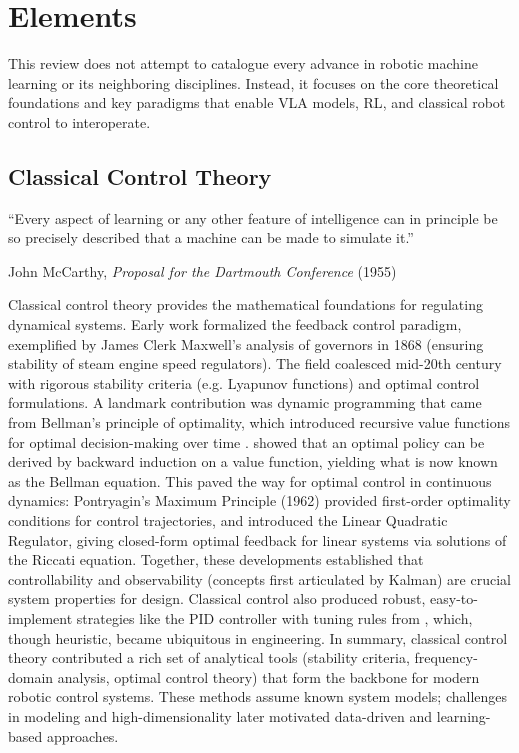 \chapter{Elements}
\label{sec:elements}


This review does not attempt to catalogue every advance in robotic machine learning or its neighboring disciplines.  Instead, it focuses on the core theoretical foundations and key paradigms that enable \ac{VLA} models, \ac{RL}, and classical robot control to interoperate.

\section{Classical Control Theory}
\epigraph{``Every aspect of learning or any other feature of intelligence can in principle be so precisely described that a machine can be made to simulate it.''}{John McCarthy, \textit{Proposal for the Dartmouth Conference} (1955)}

Classical control theory provides the mathematical foundations for regulating dynamical systems. Early work formalized the feedback control paradigm, exemplified by James Clerk Maxwell’s analysis of governors in 1868 (ensuring stability of steam engine speed regulators). The field coalesced mid-20th century with rigorous stability criteria (e.g. Lyapunov functions) and optimal control formulations. A landmark contribution was dynamic programming that came from Bellman’s principle of optimality, which introduced recursive value functions for optimal decision-making over time \cite{BELLMAN1952}. \textcite{BELLMAN1952} showed that an optimal policy can be derived by backward induction on a value function, yielding what is now known as the Bellman equation. This paved the way for optimal control in continuous dynamics: Pontryagin’s Maximum Principle (1962) provided first-order optimality conditions for control trajectories, and \textcite{KALMAN1960} introduced the Linear Quadratic Regulator, giving closed-form optimal feedback for linear systems via solutions of the Riccati equation. Together, these developments established that controllability and observability (concepts first articulated by Kalman) are crucial system properties for design. Classical control also produced robust, easy-to-implement strategies like the PID controller with tuning rules from \textcite{ZIGOPTCONTROL1942}, which, though heuristic, became ubiquitous in engineering. In summary, classical control theory contributed a rich set of analytical tools (stability criteria, frequency-domain analysis, optimal control theory) that form the backbone for modern robotic control systems. These methods assume known system models; challenges in modeling and high-dimensionality later motivated data-driven and learning-based approaches.

